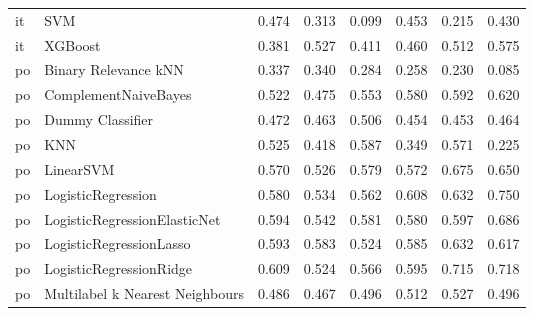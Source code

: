\begin{tabular}{llllllll}
      it &                             SVM & 0.474 &                     0.313 &                 0.099 &                  0.453 &                                   0.215 &     0.430 \\
      it &                         XGBoost & 0.381 &                     0.527 &                 0.411 &                  0.460 &                                   0.512 &     0.575 \\
      po &            Binary Relevance kNN & 0.337 &                     0.340 &                 0.284 &                  0.258 &                                   0.230 &     0.085 \\
      po &            ComplementNaiveBayes & 0.522 &                     0.475 &                 0.553 &                  0.580 &                                   0.592 &     0.620 \\
      po &                Dummy Classifier & 0.472 &                     0.463 &                 0.506 &                  0.454 &                                   0.453 &     0.464 \\
      po &                             KNN & 0.525 &                     0.418 &                 0.587 &                  0.349 &                                   0.571 &     0.225 \\
      po &                       LinearSVM & 0.570 &                     0.526 &                 0.579 &                  0.572 &                                   0.675 &     0.650 \\
      po &              LogisticRegression & 0.580 &                     0.534 &                 0.562 &                  0.608 &                                   0.632 &     0.750 \\
      po &    LogisticRegressionElasticNet & 0.594 &                     0.542 &                 0.581 &                  0.580 &                                   0.597 &     0.686 \\
      po &         LogisticRegressionLasso & 0.593 &                     0.583 &                 0.524 &                  0.585 &                                   0.632 &     0.617 \\
      po &         LogisticRegressionRidge & 0.609 &                     0.524 &                 0.566 &                  0.595 &                                   0.715 &     0.718 \\
      po & Multilabel k Nearest Neighbours & 0.486 &                     0.467 &                 0.496 &                  0.512 &                                   0.527 &     0.496 \\

\end{tabular}
